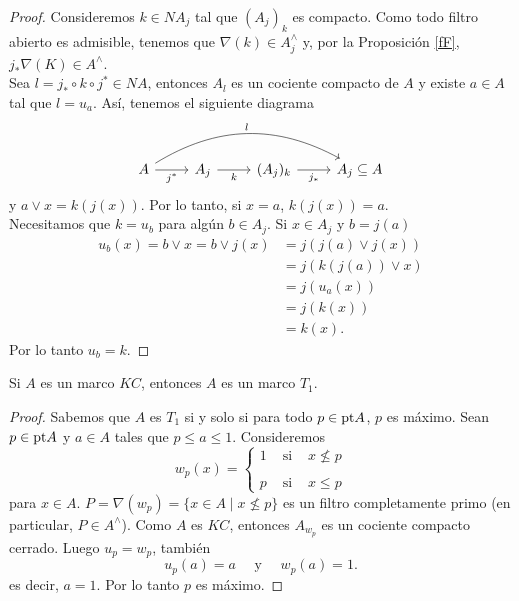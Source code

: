 \begin{proof}
Consideremos $k\in NA_j$ tal que $(A_j)_k$ es compacto. 
Como todo filtro abierto es admisible, tenemos que $\nabla(k)\in A_j^\wedge$ 
y, por la Proposición \ref{fF}, $j_*\nabla(K)\in A^\wedge$.\\

Sea $l=j_*\circ  k\circ j^*\in NA$, entonces $A_l$ es un cociente compacto de $A$ y existe $a\in A$ tal que $l=u_a$. Así, tenemos el siguiente diagrama 
\[
\begin{tikzcd}
	A \arrow[r, "j^*"'] \arrow[rrr, "l", bend left] & A_j \arrow[r, "k"'] & (A_j)_k \arrow[r, "j_*"'] & A_j\subseteq A
	\end{tikzcd}\]
y $a\vee x=k(j(x))$. Por lo tanto, si $x=a$, $k(j(x))=a$.\\

Necesitamos que $k=u_b$ para algún $b\in A_j$. Si $x\in A_j$ y $b=j(a)$
\[
\begin{split}
u_b(x)= b\vee x= b\vee j(x)& =j(j(a)\vee j(x))\\
& =j(k(j(a))\vee x)\\
& =j(u_a(x))\\
& =j(k(x))\\	
&=k(x).
\end{split}
\]
Por lo tanto $u_b=k$.
\end{proof}

\begin{prop}\label{KCT1}
    Si $A$ es un marco $KC$, entonces $A$ es un marco $T_1$.
\end{prop}

\begin{proof}
Sabemos que $A$ es $T_1$ si y solo si para todo $p\in \mathrm{pt} A$, $p$ es máximo. Sean $p\in \mathrm{pt} A$ y $a\in A$ tales que $p\leq a\leq 1$. Consideremos 
\[
w_p(x)=\left\{\begin{array}{lcc}
1 & \mbox{ si } & x\nleq p\\
\\
p & \mbox{ si } & x\leq p
\end{array}\right.
\]
para $x\in A$. $P=\nabla(w_p)=\{x\in A\mid x\nleq p\}$ es un filtro completamente primo (en particular, $P\in A^\wedge$). Como $A$ es $KC$, entonces $A_{w_p}$ es un cociente compacto cerrado. Luego $u_p=w_p$, también
\[
u_p(a)=a\quad \mbox{ y }\quad w_p(a)=1.
\]
es decir, $a=1$. Por lo tanto $p$ es máximo. 
\end{proof}

